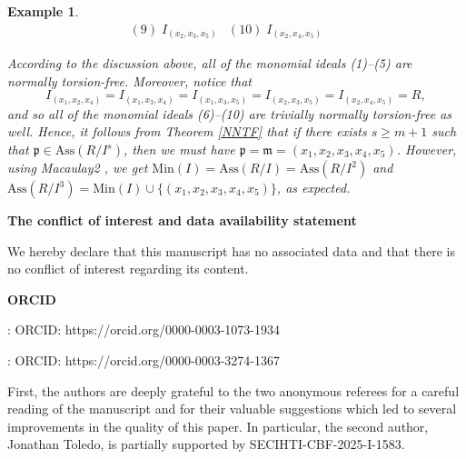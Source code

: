 \documentclass[11pt]{amsart}
\newtheorem{example}[theorem]{Example}
\begin{document}
\begin{example}
{\[\begin{array}{cccc}
(9)\; I_{(x_2,x_3,x_5)} &
(10)\; I_{(x_2,x_4,x_5)} &
&
\end{array}
\]
 
\medskip
According to the discussion above, all of the monomial ideals (1)–(5) are normally torsion-free. 
Moreover, notice that 
\[I_{(x_1,x_2,x_4)}=I_{(x_1,x_3,x_4)}=I_{(x_1,x_3,x_5)}=I_{(x_2,x_3,x_5)}=I_{(x_2,x_4,x_5)}=R,\]
and so  all of the monomial ideals (6)–(10) are trivially normally torsion-free as well.  Hence,  it follows from Theorem \ref{NNTF} 
 that if there exists  $s\geq m+1$ such that $\mathfrak{p}\in \mathrm{Ass}(R/I^s)$, then we must 
 have $\mathfrak{p}=\mathfrak{m}=(x_1, x_2, x_3, x_4, x_5)$.  
 However, using  Macaulay2 \cite{GS}, we get  $\mathrm{Min}(I)=\mathrm{Ass}(R/I)=\mathrm{Ass}(R/I^2)$ and 
 $\mathrm{Ass}(R/I^3)=\mathrm{Min}(I)\cup \{(x_1, x_2, x_3, x_4, x_5)\}$, as expected. 
  }
 \end{example}
 

\bigskip
\centerline{\bf  The conflict of interest and data availability statement}

\bigskip
We hereby declare that this manuscript has no associated  data and that there is no conflict of interest regarding its content. 
 

\bigskip
\begin{center}
{\bf  ORCID}
  \vspace{3mm}
  \hspace{2cm}  \item[\textbf{ Mehrdad Nasernejad}]: ORCID: https://orcid.org/0000-0003-1073-1934
\hspace{2cm}   \item[\textbf{Jonathan Toledo}]: ORCID: https://orcid.org/0000-0003-3274-1367
 \end{center}

 

\bigskip
{}
First, the authors  are  deeply grateful to the two anonymous referees for a  careful reading of the manuscript  and for  their   valuable suggestions which led to 
several  improvements in the quality of this paper.  In particular, the second author, Jonathan Toledo, is partially supported by SECIHTI-CBF-2025-I-1583.
\end{document}
